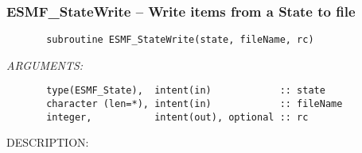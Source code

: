  
\setlength{\oldparskip}{\parskip}
\setlength{\parskip}{1.5ex}
\setlength{\oldparindent}{\parindent}
\setlength{\parindent}{0pt}
\setlength{\oldbaselineskip}{\baselineskip}
\setlength{\baselineskip}{11pt}
 
\def\bv{\begin{verbatim}}
\def\ev{\end{verbatim}}
\def\be{\begin{equation}}
\def\ee{\end{equation}}
\def\bea{\begin{eqnarray}}
\def\eea{\end{eqnarray}}
\def\bi{\begin{itemize}}
\def\ei{\end{itemize}}
\def\bn{\begin{enumerate}}
\def\en{\end{enumerate}}
\def\bd{\begin{description}}
\def\ed{\end{description}}
\def\({\left (}
\def\){\right )}
\def\[{\left [}
\def\]{\right ]}
\def\<{\left  \langle}
\def\>{\right \rangle}
\def\cI{{\cal I}}
\def\diag{\mathop{\rm diag}}
\def\tr{\mathop{\rm tr}}


 
\subsubsection [ESMF\_StateWrite] {ESMF\_StateWrite -- Write items from a State to file}


  
\begin{verbatim}       subroutine ESMF_StateWrite(state, fileName, rc)\end{verbatim}{\em ARGUMENTS:}
\begin{verbatim}       type(ESMF_State),  intent(in)            :: state 
       character (len=*), intent(in)            :: fileName
       integer,           intent(out), optional :: rc \end{verbatim}
{\sf DESCRIPTION:\\ }



